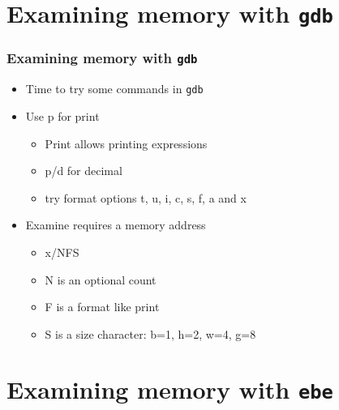 \documentclass{beamer}
\begin{document}
\section{Examining memory with {\tt gdb}}

\begin{frame}
    \frametitle{Examining memory with {\tt gdb}}
\begin{itemize}
    \item Time to try some commands in {\tt gdb}
    \item Use p for print
    \begin{itemize}
        \item Print allows printing expressions
        \item p/d for decimal
        \item try format options t, u, i, c, s, f, a and x
    \end{itemize}
    \item Examine requires a memory address
    \begin{itemize}
        \item x/NFS
        \item N is an optional count
        \item F is a format like print
        \item S is a size character: b=1, h=2, w=4, g=8
    \end{itemize}
\end{itemize}

\end{frame}

\section{Examining memory with {\tt ebe}}
\end{document}
